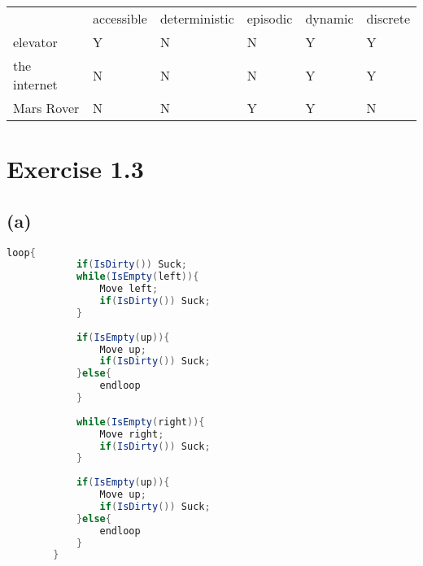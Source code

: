 \documentclass[a4paper,11pt]{scrartcl}
\begin{document}
	\begin{table}[h!]
		\begin{tabular}{llllll}
			& accessible & deterministic & episodic & dynamic & discrete \\
			elevator     & Y          & N             & N        & Y       & Y        \\
			the internet & N          & N             & N        & Y       & Y        \\
			Mars Rover   & N          & N             & Y        & Y       & N       
		\end{tabular}
	\end{table}


\section*{Exercise 1.3}

\subsection*{(a)}

	\begin{lstlisting}[language=java]
		loop{
			if(IsDirty()) Suck;
			while(IsEmpty(left)){
				Move left;
				if(IsDirty()) Suck;
			}
		
			if(IsEmpty(up)){
				Move up;
				if(IsDirty()) Suck;
			}else{
				endloop
			}
		
			while(IsEmpty(right)){
				Move right;
				if(IsDirty()) Suck;
			}
		
			if(IsEmpty(up)){
				Move up;
				if(IsDirty()) Suck;
			}else{
				endloop
			}
		}

	\end{lstlisting}

	
	

	
	
\end{document}
